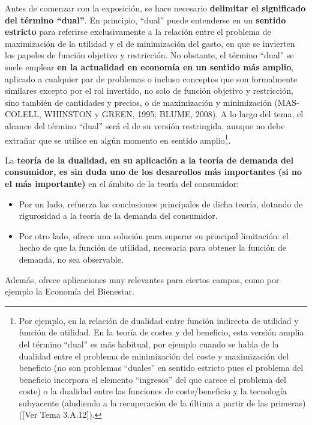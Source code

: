 \documentclass[10pt,a4paper]{article}
\newcommand{\authorfont}[1]{{\fontfamily{EBGaramond-TLF}\selectfont #1}}
\begin{document}
Antes de comenzar con la exposición, se hace necesario \textbf{delimitar el significado del término ``dual''}. En principio, ``dual'' puede entenderse en un \textbf{sentido estricto} para referirse exclusivamente a la relación entre el problema de maximización de la utilidad y el de minimización del gasto, en que se invierten los papeles de función objetivo y restricción. No obstante, el término ``dual'' se suele emplear \textbf{en la actualidad en economía en un sentido más amplio}, aplicado a cualquier par de problemas o incluso conceptos que son formalmente similares excepto por el rol invertido, no solo de función objetivo y restricción, sino también de cantidades y precios, o de maximización y minimización (MAS-COLELL, WHINSTON y GREEN, 1995; BLUME, 2008). A lo largo del tema, el alcance del término ``dual'' será el de su versión restringida, aunque no debe extrañar que se utilice en algún momento en sentido amplio\footnote{%
    Por ejemplo, en la relación de dualidad entre función indirecta de utilidad y función de utilidad. En la teoría de costes y del beneficio, esta versión amplia del término ``dual'' es más habitual, por ejemplo cuando se habla de la dualidad entre el problema de minimización del coste y maximización del beneficio (no son problemas ``duales'' en sentido estricto pues el problema del beneficio incorpora el elemento ``ingresos'' del que carece el problema del coste) o la dualidad entre las funciones de coste/beneficio y la tecnología subyacente (aludiendo a la recuperación de la última a partir de las primeras) ([\authorfont{Ver Tema 3.A.12}]).
}.

La \textbf{teoría de la dualidad, en su aplicación a la teoría de demanda del consumidor, es sin duda uno de los desarrollos más importantes (si no el más importante)} en el ámbito de la teoría del consumidor:

\begin{itemize}
    \item Por un lado, refuerza las conclusiones principales de dicha teoría, dotando de rigurosidad a la teoría de la demanda del consumidor.
    \item Por otro lado, ofrece una solución para superar su principal limitación: el hecho de que la función de utilidad, necesaria para obtener la función de demanda, no sea observable.
\end{itemize}

Además, ofrece aplicaciones muy relevantes para ciertos campos, como por ejemplo la Economía del Bienestar.
\end{document}
